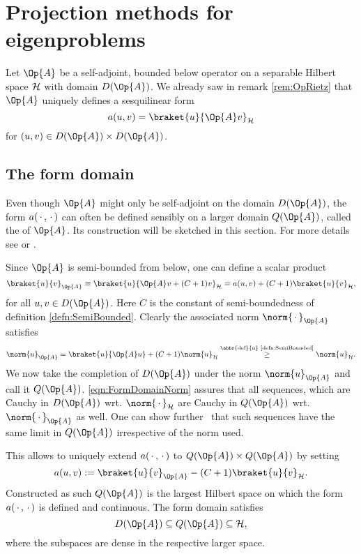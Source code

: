 \section{Projection methods for eigenproblems}
\label{sec:Projection}

Let $\Op{A}$ be a self-adjoint, bounded below operator on a separable Hilbert space
$\mathcal{H}$ with domain $D(\Op{A})$.
We already saw in remark \vref{rem:OpRietz}
that $\Op{A}$ uniquely defines a sesquilinear form
\[ a(u, v) = \braket{u}{\Op{A} v}_\hilbert \]
for $(u, v) \in D(\Op{A}) \times D(\Op{A})$.

\subsection{The form domain}
Even though $\Op{A}$ might only be self-adjoint on the domain $D(\Op{A})$,
the form $a(\,\cdot\,, \,\cdot\,)$ can often be defined sensibly
on a larger domain $Q(\Op{A})$, called the  of $\Op{A}$.
Its construction will be sketched in this section.
For more details see \cite[p. 77]{Teschl2014} or \cite[p. 276]{Reed1980}.

\noindent
Since $\Op{A}$ is semi-bounded from below, one can define a scalar product
\[
	\braket{u}{v}_{\Op{A}} \equiv \braket{u}{\Op{A} v + (C + 1) v}_{\hilbert}
	= a(u, v) + (C+1) \braket{u}{v}_{\hilbert},
\]
for all $u,v \in D(\Op{A})$.
Here $C$ is the constant of semi-boundedness of definition \vref{defn:SemiBounded}.
Clearly the associated norm $\norm{\slot}_{\Op{A}}$ satisfies
\begin{equation}
	\label{eqn:FormDomainNorm}
\norm{u}_{\Op{A}}
= \braket{u}{\Op{A} u} + (C+1) \norm{u}_{\hilbert}
\stackrel{\text{\abbr{def}{n} \ref{defn:SemiBounded}}}{\geq} \norm{u}_{\hilbert}.
\end{equation}
We now take the completion of $D(\Op{A})$ under the norm $\norm{u}_{\Op{A}}$
and call it $Q(\Op{A})$.
\eqref{eqn:FormDomainNorm} assures that all sequences,
which are Cauchy in $D(\Op{A})$ wrt. $\norm{\slot}_{\hilbert}$
are Cauchy in $Q(\Op{A})$ wrt. $\norm{\slot}_{\Op{A}}$ as well.
One can show further~\cite{Teschl2014} that such sequences
have the same limit in $Q(\Op{A})$ irrespective of the norm used.

\noindent
This allows to uniquely
extend $a(\,\cdot\,, \,\cdot\,)$ to $Q(\Op{A}) \times Q(\Op{A})$ by setting
\[ a(u, v) := \braket{u}{v}_{\Op{A}} - (C+1) \braket{u}{v}_{\hilbert}. \]
Constructed as such $Q(\Op{A})$ is the largest Hilbert space on which the form
$a(\,\cdot\,, \,\cdot\,)$ is defined and continuous.
The form domain satisfies
\[ D(\Op{A}) \subseteq Q(\Op{A}) \subseteq \hilbert, \]
where the subspaces are dense in the respective larger space.

